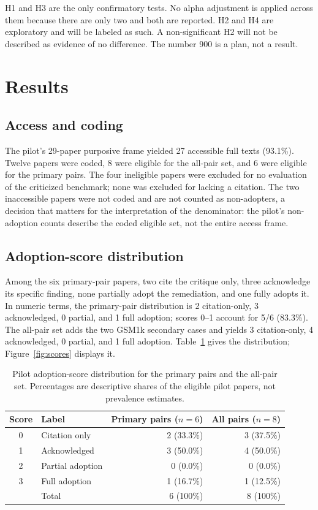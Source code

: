 \documentclass[11pt,a4paper]{article}
\begin{document}
H1 and H3 are the only confirmatory tests. No alpha adjustment is applied across them because there are only two and both are reported. H2 and H4 are exploratory and will be labeled as such. A non-significant H2 will not be described as evidence of no difference. The number 900 is a plan, not a result.

\section{Results}

\subsection{Access and coding}

The pilot's 29-paper purposive frame yielded 27 accessible full texts (93.1\%). Twelve papers were coded, 8 were eligible for the all-pair set, and 6 were eligible for the primary pairs. The four ineligible papers were excluded for no evaluation of the criticized benchmark; none was excluded for lacking a citation. The two inaccessible papers were not coded and are not counted as non-adopters, a decision that matters for the interpretation of the denominator: the pilot's non-adoption counts describe the coded eligible set, not the entire access frame.

\subsection{Adoption-score distribution}

Among the six primary-pair papers, two cite the critique only, three acknowledge its specific finding, none partially adopt the remediation, and one fully adopts it. In numeric terms, the primary-pair distribution is 2 citation-only, 3 acknowledged, 0 partial, and 1 full adoption; scores 0--1 account for 5/6 (83.3\%). The all-pair set adds the two GSM1k secondary cases and yields 3 citation-only, 4 acknowledged, 0 partial, and 1 full adoption. Table~\ref{tab:scores} gives the distribution; Figure~\ref{fig:scores} displays it.

\begin{table}[t]
\centering
\caption{Pilot adoption-score distribution for the primary pairs and the all-pair set. Percentages are descriptive shares of the eligible pilot papers, not prevalence estimates.}
\label{tab:scores}
\footnotesize
\begin{tabular}{@{}c l r r@{}}
\toprule
Score & Label & Primary pairs ($n = 6$) & All pairs ($n = 8$) \\
\midrule
0 & Citation only & 2 (33.3\%) & 3 (37.5\%) \\
1 & Acknowledged & 3 (50.0\%) & 4 (50.0\%) \\
2 & Partial adoption & 0 (0.0\%) & 0 (0.0\%) \\
3 & Full adoption & 1 (16.7\%) & 1 (12.5\%) \\
\midrule
 & Total & 6 (100\%) & 8 (100\%) \\
\bottomrule
\end{tabular}
\end{table}
\end{document}
